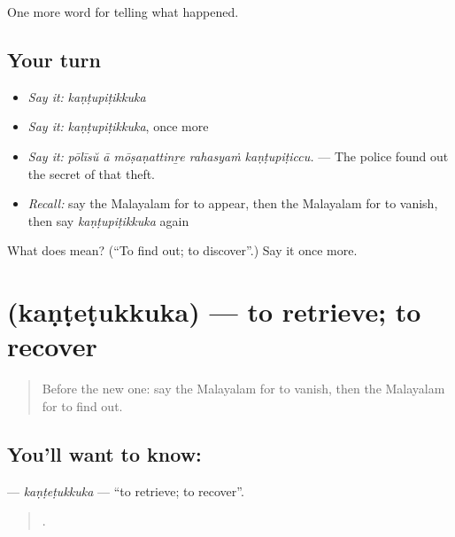 \begin{grammarlens}[title={What you've built}]
One more word for telling what happened.
\end{grammarlens}

\subsection*{Your turn}
\begin{itemize}
\raggedright
  \item \emph{Say it:} \emph{kaṇṭupiṭikkuka}
  \item \emph{Say it:} \emph{kaṇṭupiṭikkuka}, once more
  \item \emph{Say it:} \emph{pōlīsŭ ā mōṣaṇattinṟe rahasyaṁ kaṇṭupiṭiccu.} — The police found out the secret of that theft.
  \item \emph{Recall:} say the Malayalam for to appear, then the Malayalam for to vanish, then say \emph{kaṇṭupiṭikkuka} again
\end{itemize}

\begin{tcolorbox}[breakable,colback=teal!4,colframe=teal!35!black,title={Before you move on}]
What does  mean? (\textquotedblleft{}To find out; to discover\textquotedblright{}.) Say it once more.
\end{tcolorbox}
\section[\texorpdfstring{\ml{കണ്ടെടുക്കുക} (kaṇṭeṭukkuka)}{കണ്ടെടുക്കുക (kaṇṭeṭukkuka)}]{ (kaṇṭeṭukkuka) — to retrieve; to recover}

\label{lesson:ML-C383-kantetukkuka}



\begin{quote}
Before the new one: say the Malayalam for to vanish, then the Malayalam for to find out.
\end{quote}

\subsection*{You'll want to know: }
\textbf{} — \emph{kaṇṭeṭukkuka} — \textquotedblleft{}to retrieve; to recover\textquotedblright{}.

\begin{quote}
   .
\end{quote}

